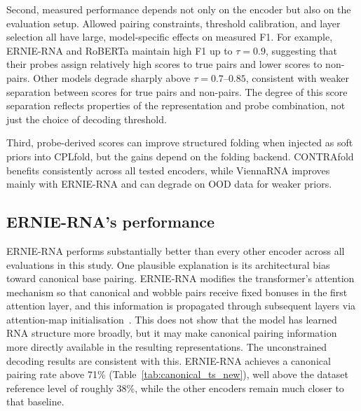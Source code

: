 \documentclass[logo,bsc,singlespacing,parskip]{infthesis}
\begin{document}
Second, measured performance depends not only on the encoder but also on the evaluation setup. Allowed pairing constraints, threshold calibration, and layer selection all have large, model-specific effects on measured F1. For example, ERNIE-RNA and RoBERTa maintain high F1 up to $\tau = 0.9$, suggesting that their probes assign relatively high scores to true pairs and lower scores to non-pairs. Other models degrade sharply above $\tau = 0.7$--$0.85$, consistent with weaker separation between scores for true pairs and non-pairs. The degree of this score separation reflects properties of the representation and probe combination, not just the choice of decoding threshold.

Third, probe-derived scores can improve structured folding when injected as soft priors into CPLfold, but the gains depend on the folding backend. CONTRAfold benefits consistently across all tested encoders, while ViennaRNA improves mainly with ERNIE-RNA and can degrade on OOD data for weaker priors.

\subsection{ERNIE-RNA's performance}
\label{sec:disc_ernie}
ERNIE-RNA performs substantially better than every other encoder across all evaluations in this study. One plausible explanation is its architectural bias toward canonical base pairing. ERNIE-RNA modifies the transformer's attention mechanism so that canonical and wobble pairs receive fixed bonuses in the first attention layer, and this information is propagated through subsequent layers via attention-map initialisation~\citep{yin2025ernie}. This does not show that the model has learned RNA structure more broadly, but it may make canonical pairing information more directly available in the resulting representations. The unconstrained decoding results are consistent with this. ERNIE-RNA achieves a canonical pairing rate above 71\% (Table~\ref{tab:canonical_ts_new}), well above the dataset reference level of roughly 38\%, while the other encoders remain much closer to that baseline.
\end{document}
